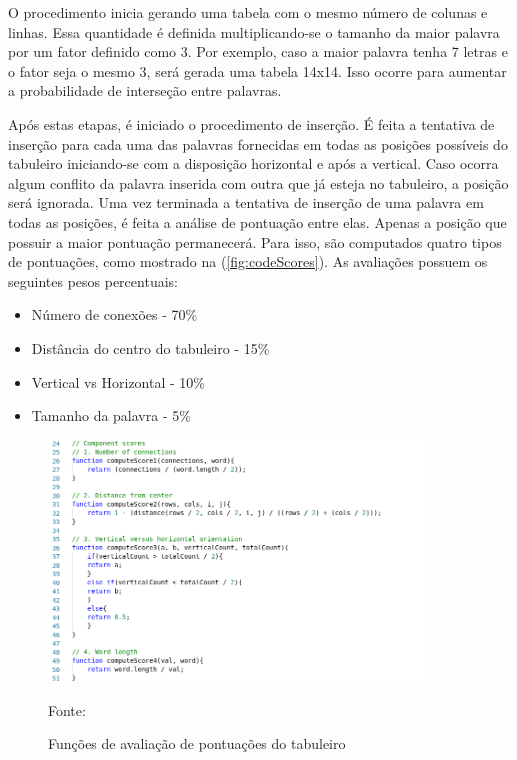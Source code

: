 O procedimento inicia gerando uma tabela com o mesmo número de colunas e linhas. Essa quantidade é definida multiplicando-se o tamanho da maior palavra por um fator definido como 3. Por exemplo, caso a maior palavra tenha 7 letras e o fator seja o mesmo 3, será gerada uma tabela 14x14. Isso ocorre para aumentar a probabilidade de interseção entre palavras. 

Após estas etapas, é iniciado o procedimento de inserção. É feita a tentativa de inserção para cada uma das palavras fornecidas em todas as posições possíveis do tabuleiro iniciando-se com a disposição horizontal e após a vertical. Caso ocorra algum conflito da palavra inserida com outra que já esteja no tabuleiro, a posição será ignorada. Uma vez terminada a tentativa de inserção de uma palavra em todas as posições, é feita a análise de pontuação entre elas. Apenas a posição que possuir a maior pontuação permanecerá. Para isso, são computados quatro tipos de pontuações, como mostrado na (\autoref{fig:codeScores}). As avaliações possuem os seguintes pesos percentuais:

\begin{itemize}
    \item Número de conexões - 70\%
    \item Distância do centro do tabuleiro - 15\%
    \item Vertical vs Horizontal - 10\%
    \item Tamanho da palavra - 5\%
\end{itemize}

\begin{figure}[H]
\centering
    \caption{Funções de avaliação de pontuações do tabuleiro}
    \label{fig:codeScores}
    \includegraphics[width=0.9\textwidth]{Figuras/codeComponentScores.png}
    
    Fonte: \cite{layoutGenerator}
\end{figure}

